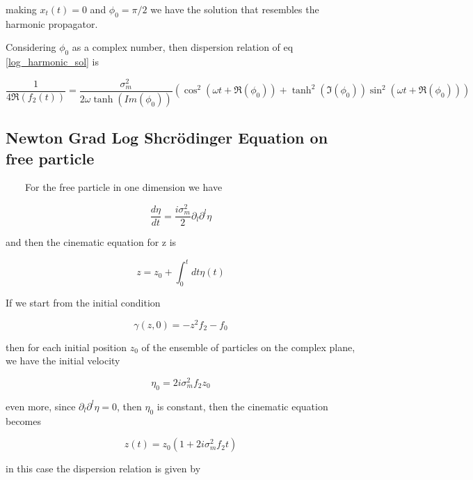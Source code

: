 \documentclass[a4paper,12pt]{article}
\begin{document}
making $x_t(t) = 0$ and $\phi_0 = \pi/2$ we have the solution that resembles the harmonic propagator. 

Considering $\phi_0$ as a complex number, then dispersion relation of eq \ref{log_harmonic_sol} is

\begin{equation}\label{dispersion_harmonic}
\frac{1}{4\Re(f_2(t))} = \frac{ \sigma_m^2 }{2 \omega \tanh(Im(\phi_0))}  (\cos^2(\omega t + \Re(\phi_0)) + \tanh^2(\Im(\phi_0)) \sin^2(\omega t + \Re(\phi_0)))
\end{equation}




\subsection{Newton Grad Log Shcr\"odinger Equation on free particle}

~~~~For the free particle in one dimension we have

\begin{equation}
\frac{d \eta}{dt} =  \frac{i\sigma_m^2}{2 } \partial_l \partial^l \eta
\end{equation}

and then the cinematic equation for z is

\begin{equation}
z  =  z_0 + \int_0^t dt \eta(t)
\end{equation}

If we start from the initial condition

\begin{equation}
\gamma(z,0) = -z^2 f_2 - f_0
\end{equation} 

then for each initial position $z_0$ of the ensemble of particles  on the complex plane, we have the initial velocity

\begin{equation}
\eta_0 = 2 i \sigma_m^2 f_2 z_0
\end{equation}

even more, since $\partial_l \partial^l \eta = 0$, then $\eta_0$ is constant, then the cinematic equation becomes

\begin{equation}
z(t) = z_0(1+2i\sigma_m^2f_2t)
\end{equation}

in this case the dispersion relation is given by 
\end{document}
